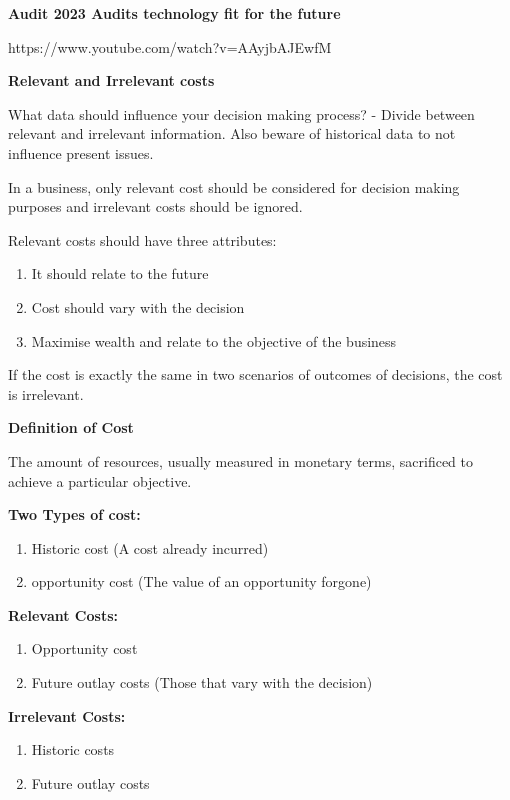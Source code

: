 \documentclass{article}
\begin{document}
\textbf{Audit 2023 Audits technology fit for the future}

https://www.youtube.com/watch?v=AAyjbAJEwfM

\textbf{Relevant and Irrelevant costs}

What data should influence your decision making process? - Divide between relevant and irrelevant information. Also beware of historical data to not influence present issues. 

In a business, only relevant cost should be considered for decision making purposes and irrelevant costs should be ignored.

Relevant costs should have three attributes:
    \begin{enumerate}
      \item It should relate to the future
      \item Cost should vary with the decision
      \item Maximise wealth and relate to the objective of the business  
    \end{enumerate}
   
If the cost is exactly the same in two scenarios of outcomes of decisions, the cost is irrelevant.

\textbf{Definition of Cost}


The amount of resources, usually measured in monetary terms, sacrificed to achieve a particular objective.

\textbf{Two Types of cost:}

    \begin{enumerate}
      \item Historic cost (A cost already incurred)
      \item opportunity cost (The value of an opportunity forgone)
    \end{enumerate}
   
\textbf{Relevant Costs:}

    \begin{enumerate}
      \item Opportunity cost 
      \item Future outlay costs (Those that vary with the decision)
    \end{enumerate}
   
\textbf{Irrelevant Costs:}

\begin{enumerate}
  \item Historic costs
  \item Future outlay costs 
\end{enumerate}
\end{document}

